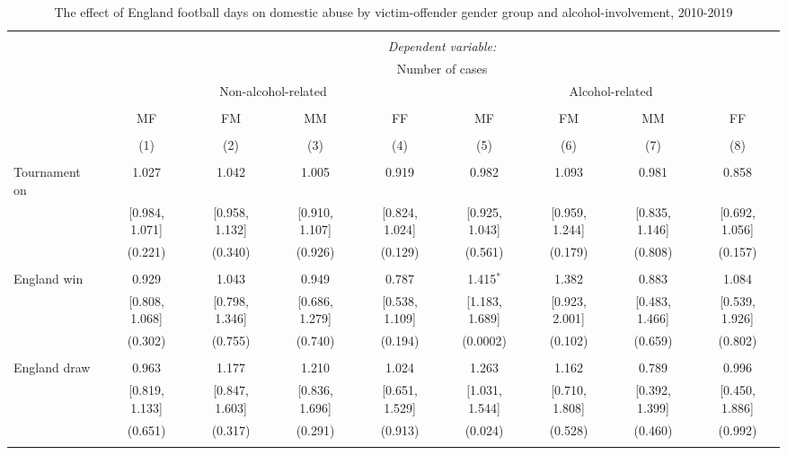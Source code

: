 \documentclass[12pt, a4paper]{article}
\begin{document}
\begin{table}
\centering
 \caption{The effect of England football days on domestic abuse by victim-offender gender group and alcohol-involvement, 2010-2019}
   \label{gender}
 \begin{threeparttable}
\begin{tabular}{@{\extracolsep{1pt}}lcccccccc} 
\\[-1.8ex]\hline 
\hline \\[-1.8ex] 
 & \multicolumn{8}{c}{\textit{Dependent variable:}} \\ 
   & \multicolumn{8}{c}{Number of cases} \\ 
  & \multicolumn{4}{c}{Non-alcohol-related} &\multicolumn{4}{c}{Alcohol-related} \\ 
\cline{2-9} 
\\[-1.8ex] & MF & FM & MM & FF & MF & FM & MM & FF \\ 
\\[-1.8ex] & (1) & (2) & (3) & (4) & (5) & (6) & (7) & (8)\\ 
\hline \\[-1.8ex] 
 Tournament on & 1.027 & 1.042 & 1.005 & 0.919 & 0.982 & 1.093 & 0.981 & 0.858 \\ 
  & [0.984, 1.071] & [0.958, 1.132] & [0.910, 1.107] & [0.824, 1.024] & [0.925, 1.043] & [0.959, 1.244] & [0.835, 1.146] & [0.692, 1.056] \\ 
  & (0.221) & (0.340) & (0.926) & (0.129) & (0.561) & (0.179) & (0.808) & (0.157) \\ 
  & & & & & & & & \\ 
 England win & 0.929 & 1.043 & 0.949 & 0.787 & 1.415$^{*}$ & 1.382 & 0.883 & 1.084 \\ 
  & [0.808, 1.068] & [0.798, 1.346] & [0.686, 1.279] & [0.538, 1.109] & [1.183, 1.689] & [0.923, 2.001] & [0.483, 1.466] & [0.539, 1.926] \\ 
  & (0.302) & (0.755) & (0.740) & (0.194) & (0.0002) & (0.102) & (0.659) & (0.802) \\ 
  & & & & & & & & \\ 
 England draw & 0.963 & 1.177 & 1.210 & 1.024 & 1.263 & 1.162 & 0.789 & 0.996 \\ 
  & [0.819, 1.133] & [0.847, 1.603] & [0.836, 1.696] & [0.651, 1.529] & [1.031, 1.544] & [0.710, 1.808] & [0.392, 1.399] & [0.450, 1.886] \\ 
  & (0.651) & (0.317) & (0.291) & (0.913) & (0.024) & (0.528) & (0.460) & (0.992) \\ 
  & & & & & & & & \\ 

\end{tabular}
\end{threeparttable}
\end{table}
\end{document}

